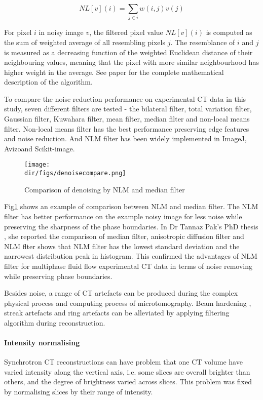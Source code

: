 $$NL[v](i)=\sum_{j\in i}w(i,j)v(j)$$

For pixel $i$ in noisy image $v$, the filtered pixel value $NL[v](i)$ is computed as the sum of weighted average of all resembling pixels $j$. The resemblance of $i$ and $j$ is measured as a decreasing function of the weighted Euclidean distance of their neighbouring values, meaning that the pixel with more similar neighbourhood has higher weight in the average. See \cite{buades2011non} paper for the complete mathematical description of the algorithm.

To compare the noise reduction performance on experimental CT data in this study, seven different filters are tested - the bilateral filter, total variation filter, Gaussian filter, Kuwahara filter, mean filter, median filter and non-local means filter. Non-local means filter has the best performance preserving edge features and noise reduction. And NLM filter has been widely implemented in ImageJ, Avizo\texttrademark and Scikit-image.

\begin{figure}[htbp]
  \centering
  \texttt{[image: \\dir/figs/denoisecompare.png]}
  \caption{Comparison of denoising by NLM and median filter}
  \label{denoisecompare}
\end{figure}

Fig\ref{denoisecompare} shows an example of comparison between NLM and median filter. The NLM filter has better performance on the example noisy image for less noise while preserving the sharpness of the phase boundaries. In Dr Tannaz Pak's PhD thesis \citeyear{Pak2014thesis}, she reported the comparison of median filter, anisotropic diffusion filter and NLM flter shows that NLM filter has the lowest standard deviation and the narrowest distribution peak in histogram. This confirmed the advantages of NLM filter for multiphase fluid flow experimental CT data in terms of noise removing while preserving phase boundaries.

Besides noise, a range of CT artefacts can be produced during the complex physical process and computing process of microtomography. Beam hardening , streak artefacts and ring artefacts can be alleviated by applying filtering algorithm during reconstruction. 

\paragraph{Intensity normalising} Synchrotron CT reconstructions can have problem that one CT volume have varied intensity along the vertical axis, i.e. some slices are overall brighter than others, and the degree of brightness varied across slices. This problem was fixed by normalising slices by their range of intensity.

